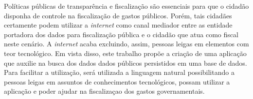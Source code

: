 Políticas públicas de transparência e fiscalização são essenciais para que o cidadão disponha de controle na fiscalização de gastos públicos. Porém, tais cidadães certamente podem utilizar a \textit{internet} como canal mediador entre as entidade portadora dos dados para fiscalização pública e o cidadão que atua como fiscal neste cenário. A \textit{internet} acaba excluindo, assim, pessoas leigas em elementos com teor tecnológico.
Em vista disso, este trabalho propõe a criação de uma aplicação que auxilie na busca dos dados dados públicos persistidos em uma base de dados. Para facilitar a utilização, será utilizada a linguagem natural possibilitando a pessoas leigas em assuntos de conhecimentos tecnológicos, possam utilizar a aplicação e poder ajudar na fiscalizaçao dos gastos governamentais.
